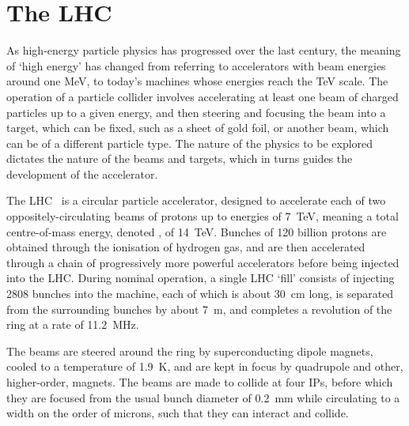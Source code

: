\chapter{The \acl{LHC}}
\label{chap:intro:lhc}

As high-energy particle physics has progressed over the last century, the 
meaning of `high energy' has changed from referring to accelerators with beam 
energies around one \si{\MeV}, to today's machines whose energies reach the 
\si{\TeV} scale.
The operation of a particle collider involves accelerating at least one beam of 
charged particles up to a given energy, and then steering and focusing the beam 
into a target, which can be fixed, such as a sheet of gold foil, or another 
beam, which can be of a different particle type.
The nature of the physics to be explored dictates the nature of the beams and 
targets, which in turns guides the development of the accelerator.

The \acl{LHC}~\cite{Bruning:2004ej} is a circular particle accelerator, 
designed to accelerate each of two oppositely-circulating beams of protons up 
to energies of \SI{7}{\TeV}, meaning a total centre-of-mass energy, denoted 
\sqrts, of \SI{14}{\TeV}.
Bunches of 120 billion protons are obtained through the ionisation of hydrogen 
gas, and are then accelerated through a chain of progressively more powerful 
accelerators before being injected into the \ac{LHC}.
During nominal operation, a single \ac{LHC} `fill' consists of injecting 2808 
bunches into the machine, each of which is about \SI{30}{\centi\metre} long, is 
separated from the surrounding bunches by about \SI{7}{\metre}, and completes a 
revolution of the ring at a rate of \SI{11.2}{\mega\hertz}.

The beams are steered around the ring by superconducting dipole magnets, cooled 
to a temperature of \SI{1.9}{\kelvin}, and are kept in focus by quadrupole and 
other, higher-order, magnets.
The beams are made to collide at four \acp{IP}, before which they are focused 
from the usual bunch diameter of \SI{0.2}{\milli\metre} while circulating to a 
width on the order of microns, such that they can interact and collide.

